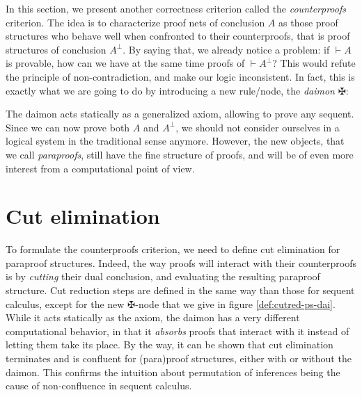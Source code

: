 \documentclass[12pt]{report}
\newcommand{\dai}{✠}
\newcommand{\seq}{\vdash}
\newcommand{\irule}[1]{\vspace*{-10em}\footnotesize$#1$}
\begin{document}
In this section, we present another correctness criterion called the \emph{counterproofs} criterion.
The idea is to characterize proof nets of conclusion $A$ as those proof structures who behave well
when confronted to their counterproofs, that is proof structures of conclusion $A^\bot$. By saying
that, we already notice a problem: if $\seq A$ is provable, how can we have at the same time proofs
of $\seq A^\bot$? This would refute the principle of non-contradiction, and make our logic
inconsistent. In fact, this is exactly what we are going to do by introducing a new rule/node, the
\emph{daimon} $\dai$:
\vspace{-1.5em}
\vspace{1em}

The daimon acts statically as a generalized axiom, allowing to prove any sequent. Since we can now
prove both $A$ and $A^\bot$, we should not consider ourselves in a logical system in the traditional
sense anymore. However, the new objects, that we call \emph{paraproofs}, still have the fine
structure of proofs, and will be of even more interest from a computational point of view.

\section{Cut elimination}

To formulate the counterproofs criterion, we need to define cut elimination for paraproof
structures. Indeed, the way proofs will interact with their counterproofs is by \emph{cutting} their
dual conclusion, and evaluating the resulting paraproof structure. Cut reduction steps are defined
in the same way than those for sequent calculus, except for the new $\dai$-node that we give in
figure \ref{def:cutred-ps-dai}. While it acts statically as the axiom, the daimon has a very
different computational behavior, in that it \emph{absorbs} proofs that interact with it instead of
letting them take its place. By the way, it can be shown that cut elimination terminates and is
confluent for (para)proof structures, either with or without the daimon. This confirms the intuition
about permutation of inferences being the cause of non-confluence in sequent calculus.
\end{document}
